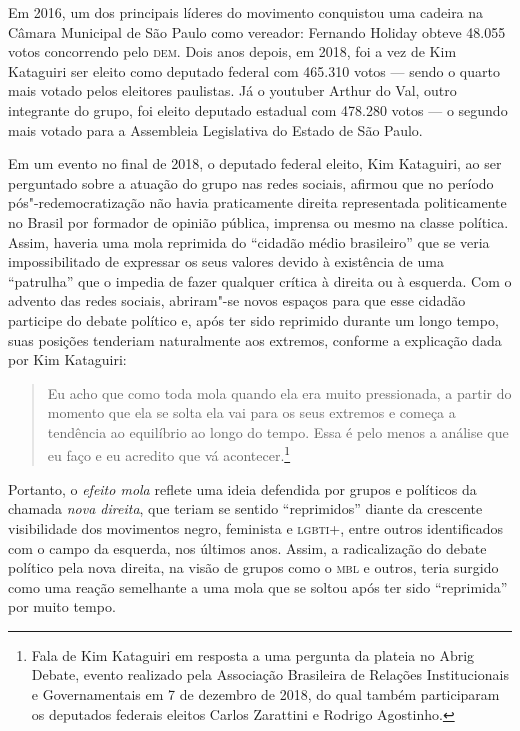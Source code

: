 Em 2016, um dos principais líderes do movimento conquistou uma cadeira
na Câmara Municipal de São Paulo como vereador: Fernando Holiday obteve
48.055 votos concorrendo pelo \textsc{dem}. Dois anos depois, em 2018, foi a vez
de Kim Kataguiri ser eleito como deputado federal com 465.310 votos ---
sendo o quarto mais votado pelos eleitores paulistas. Já o youtuber
Arthur do Val, outro integrante do grupo, foi eleito deputado estadual
com 478.280 votos --- o segundo mais votado para a Assembleia Legislativa
do Estado de São Paulo.

Em um evento no final de 2018, o deputado federal eleito, Kim Kataguiri,
ao ser perguntado sobre a atuação do grupo nas redes sociais, afirmou
que no período pós"-redemocratização não havia praticamente direita
representada politicamente no Brasil por formador de opinião pública,
imprensa ou mesmo na classe política. Assim, haveria uma mola reprimida
do ``cidadão médio brasileiro'' que se veria impossibilitado de
expressar os seus valores devido à existência de uma ``patrulha'' que o
impedia de fazer qualquer crítica à direita ou à esquerda. Com o advento
das redes sociais, abriram"-se novos espaços para que esse cidadão
participe do debate político e, após ter sido reprimido durante um longo
tempo, suas posições tenderiam naturalmente aos extremos, conforme a
explicação dada por Kim Kataguiri:

\begin{quote}
Eu acho que como toda mola quando ela era muito pressionada, a
partir do momento que ela se solta ela vai para os seus extremos e
começa a tendência ao equilíbrio ao longo do tempo. Essa é pelo menos a
análise que eu faço e eu acredito que vá acontecer.\footnote{Fala de Kim Kataguiri em resposta a uma
  pergunta da plateia no Abrig Debate, evento realizado pela Associação
  Brasileira de Relações Institucionais e Governamentais em 7 de
  dezembro de 2018, do qual também participaram os deputados federais
  eleitos Carlos Zarattini e Rodrigo Agostinho.}
\end{quote}

Portanto, o \textit{efeito mola} reflete uma ideia defendida por grupos e
políticos da chamada \textit{nova direita}, que teriam se sentido
``reprimidos'' diante da crescente visibilidade dos movimentos negro,
feminista e \textsc{lgbti}+, entre outros identificados com o campo da esquerda,
nos últimos anos. Assim, a radicalização do debate político pela nova
direita, na visão de grupos como o \textsc{mbl} e outros, teria surgido como uma
reação semelhante a uma mola que se soltou após ter sido ``reprimida''
por muito tempo.


